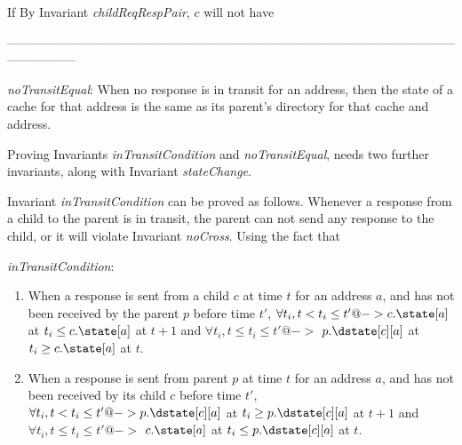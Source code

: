 If By Invariant \textit{childReqRespPair}, $c$
will not have 

-----------------------------------------------------------------------------------------------------------------------------


\begin{inv}
\textit{noTransitEqual}: When no response is in transit for an address, then
the state of a cache for that address is the same as its parent's directory for
that cache and address.
\label{noTransitEqual}
\end{inv}

Proving Invariants \textit{inTransitCondition} and \textit{noTransitEqual},
needs two further invariants, along with Invariant \textit{stateChange}.

Invariant \textit{inTransitCondition} can be proved as follows. Whenever a
response from a child to the parent is in transit, the parent can not send any
response to the child, or it will violate Invariant \textit{noCross}. Using the fact that 







\begin{inv}
\textit{inTransitCondition}:
\begin{enumerate}
\item When a response is sent from a child $c$ at time $t$ for an address $a$,
and has not been received by the parent $p$ before time $t'$, $\forall t_i, t <
t_i \le t' @-> c.\state[a]$ at $t_i \le c.\state[a]$ at $t+1$ and $\forall t_i,
t \le t_i \le t' @->$ $p.\dstate[c][a]$ at $t_i \ge c.\state[a]$ at $t$.
\item When a response is sent from parent $p$ at time $t$ for an address $a$,
and has not been received by its child $c$ before time $t'$, $\forall t_i, t <
t_i \le t' @-> p.\dstate[c][a]$ at $t_i \ge p.\dstate[c][a]$ at $t+1$ and
$\forall t_i, t \le t_i \le t' @->$ $c.\state[a]$ at $t_i \le p.\dstate[c][a]$ at
$t$.
\end{enumerate}
\label{inTransitCondition}
\end{inv}

